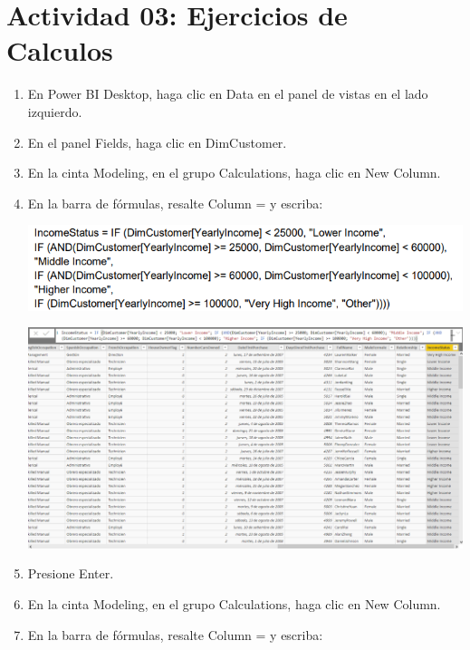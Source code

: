\section{Actividad 03: Ejercicios de Calculos} 

\begin{enumerate}[1.]
    \item En Power BI Desktop, haga clic en Data en el panel de vistas en el lado izquierdo.

    \item En el panel Fields, haga clic en DimCustomer.

    \item En la cinta Modeling, en el grupo Calculations, haga clic en New Column.
    \item En la barra de fórmulas, resalte Column = y escriba:\\

	\begin{center}
	\includegraphics[width=13cm]{./Imagenes/code}
	\end{center}	

	\begin{center}
	\includegraphics[width=18cm]{./Imagenes/power10}
	\end{center}	

    \item Presione Enter.
    \item En la cinta Modeling, en el grupo Calculations, haga clic en New Column.
    \item En la barra de fórmulas, resalte Column = y escriba: \\


\end{enumerate}
